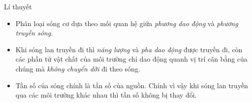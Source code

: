 \begin{dang}{Lí thuyết}
\begin{itemize}
\item Phân loại sóng cơ dựa theo mối quan hệ giữa \textit{phương dao động} và \textit{phương truyền sóng}.
\item Khi sóng lan truyền đi thì \textit{năng lượng} và \textit{pha dao động} được truyền đi, còn các phần tử vật chất của môi trường chỉ dao động quanh vị trí cân bằng của chúng mà \textit{không chuyển dời} đi theo sóng.
\item Tần số của sóng chính là tần số của nguồn. Chính vì vậy khi sóng lan truyền qua các môi trường khác nhau thì tần số không bị thay đổi.
\end{itemize}
\end{dang}
